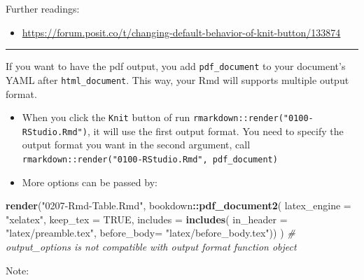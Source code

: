 \documentclass[
  a4paper,
  twoside,
  openright]{book}
\newenvironment{Shaded}{\begin{snugshade}}{\end{snugshade}}
\newcommand{\AttributeTok}[1]{\textcolor[rgb]{0.13,0.29,0.53}{#1}}
\newcommand{\CommentTok}[1]{\textcolor[rgb]{0.56,0.35,0.01}{\textit{#1}}}
\newcommand{\ConstantTok}[1]{\textcolor[rgb]{0.56,0.35,0.01}{#1}}
\newcommand{\FunctionTok}[1]{\textcolor[rgb]{0.13,0.29,0.53}{\textbf{#1}}}
\newcommand{\NormalTok}[1]{#1}
\newcommand{\SpecialCharTok}[1]{\textcolor[rgb]{0.81,0.36,0.00}{\textbf{#1}}}
\newcommand{\StringTok}[1]{\textcolor[rgb]{0.31,0.60,0.02}{#1}}
\providecommand{\tightlist}{%
  \setlength{\itemsep}{0pt}\setlength{\parskip}{0pt}}
\theoremstyle{definition}
\theoremstyle{definition}
\theoremstyle{definition}
\theoremstyle{definition}
\theoremstyle{remark}
\begin{document}
Further readings:

\begin{itemize}
\tightlist
\item
  \url{https://forum.posit.co/t/changing-default-behavior-of-knit-button/133874}
\end{itemize}

\begin{center}\rule{0.5\linewidth}{0.5pt}\end{center}

If you want to have the pdf output, you add \texttt{pdf\_document} to your document's YAML after \texttt{html\_document}. This way, your Rmd will supports multiple output format.

\begin{itemize}
\tightlist
\item
  When you click the \texttt{Knit} button of run \texttt{rmarkdown::render("0100-RStudio.Rmd")}, it will use the first output format. You need to specify the output format you want in the second argument, call \texttt{rmarkdown::render("0100-RStudio.Rmd",\ \textquotesingle{}pdf\_document\textquotesingle{})}
\item
  More options can be passed by:
\end{itemize}

\begin{Shaded}
\begin{Highlighting}[]
\FunctionTok{render}\NormalTok{(}\StringTok{"0207{-}Rmd{-}Table.Rmd"}\NormalTok{, }
\NormalTok{bookdown}\SpecialCharTok{::}\FunctionTok{pdf\_document2}\NormalTok{(}
    \AttributeTok{latex\_engine =} \StringTok{"xelatex"}\NormalTok{,}
    \AttributeTok{keep\_tex =} \ConstantTok{TRUE}\NormalTok{,}
    \AttributeTok{includes =} \FunctionTok{includes}\NormalTok{(}
       \AttributeTok{in\_header =} \StringTok{"latex/preamble.tex"}\NormalTok{,}
       \AttributeTok{before\_body=} \StringTok{"latex/before\_body.tex"}\NormalTok{))}
\NormalTok{    )}
\CommentTok{\# \textasciigrave{}output\_options\textasciigrave{} is not compatible with output format function object}
\end{Highlighting}
\end{Shaded}

Note:
\end{document}
